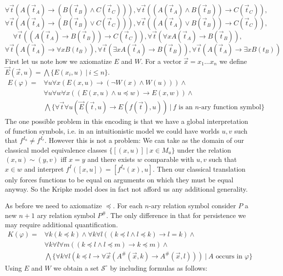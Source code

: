 \documentclass[a4paper,UKenglish,cleveref, autoref, thm-restate]{lipics-v2021}
\begin{document}
$$\forall \vec t(A(\vec t_{A})\to (B(\vec t_B)\wedge C(\vec t_C))), \forall \vec t((A(\vec t_{A})\wedge B(\vec t_B))\to C(\vec t_C)),$$$$ \forall \vec t(A(\vec t_{A})\to (B(\vec t_B)\vee C(\vec t_C))),
\forall \vec t((A(\vec t_{A})\vee B(\vec t_B))\to C(\vec t_C)),$$$$ \forall \vec t((A(\vec t_A)\to B(\vec t_B))\to C(\vec t_C)),\forall \vec t(\forall xA(\vec t_A)\to B(\vec t_B)),$$$$ \forall \vec t(A(\vec t_A)\to\forall xB(t_B)), \forall \vec t(\exists xA(\vec t_A)\to B(\vec t_B)), \forall \vec t(A(\vec t_A)\to\exists xB(t_B))$$	
First let us note how we axiomatize $E$ and $W$. For a vector $\vec x = x_1\dots x_n$ we define $\vec E(\vec x, u) = \bigwedge\{E(x_i, u)\:|\:i\leq n\}$.
\begin{align*}
	E(\varphi) = & \forall u\forall x(E(x, u)\to(\neg W(x)\wedge W(u)))\wedge\\
	& \forall u\forall w\forall x((E(x, u)\wedge u\preceq w)\to E(x, w))\wedge\\
	& \bigwedge\{\forall\vec t\forall u(\vec E(\vec t, u)\to E(f(\vec t), u))\:|\:\text{$f$ is an $n$-ary function symbol}\}
\end{align*}
The one possible problem in this encoding is that we have a global interpretation of function symbols, i.e. in an intuitionistic model we could have worlds $u, v$ such that $f^{I_u}\neq f^{I_v}$. However this is not a problem: We can take as the domain of our classical model equivalence classes $\{[(x, u)]\:|\: x\in M_u\}$ under the relation $(x, u)\sim (y, v)$ iff $x = y$ and there exists $w$ comparable with $u, v$ such that $x\in w$ and interpret $f^I([x, u]) = [f^{I_u}(x), u]$. Then our classical translation only forces functions to be equal on arguments on which they must be equal anyway. So the Kripke model does in fact not afford us any additional generality.

As before we need to axiomatize $\preceq$. For each $n$-ary relation symbol consider $P$ a new $n+1$ ary relation symbol $P^\#$.  The only difference in that for persistence we may require additional quantification. 
\begin{align*}
	K(\varphi) = & \forall k(k\preceq k)\wedge \forall k\forall l((k\preceq l\wedge l\preceq k)\to l = k)\wedge\\
	& \forall k\forall l\forall m((k\preceq l\wedge l\preceq m)\to k\preceq m)\wedge\\
	& \bigwedge\{\forall k\forall l(k\preceq l\to \forall \vec x(A^\#(\vec x, k)\to A^\#(\vec x, l)))\:|\:\text{$A$ occurs in $\varphi$}\}
\end{align*}
Using $E$ and $W$ we obtain a set $\mathcal S^\circ$ by including formulas as follows:
\end{document}
